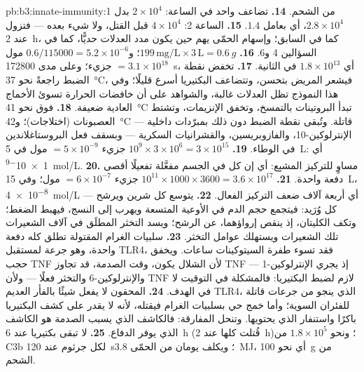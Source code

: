 \begin{solution}{pb:b3:innate-immunity:1}
من الشحم.
\textbf{14.} تضاعف واحد في الساعة: $2\times 10^{4}$ بدل
$2.8\times 10^{4}$، أي بعامل $1.4$.
\textbf{15.} الساعة 2: $4\times 10^{4}$ قبل القتل، ولا شيء بعده ---
فتزول عند \qty{2}{h}، كما في السابق؛ وإسهام الحمّى يهم حين
يكون مدد العدلات حديًّا، كما في السؤالين 4 و6.
\textbf{16.} $199\,\text{mg/L}\times 3\,\text{L} = \qty{0.6}{g}$؛ و$0.6/
\num{115000} = 5.2\times 10^{-6}$ مول $= 3.1\times 10^{18}$ جزيء؛
وعلى مدى \qty{172800}{s}، أي $1.8\times 10^{13}$ في الثانية.
\textbf{17.} تخفض نقطة الضبط راجعةً نحو \qty{37}{\celsius}، فيشعر
المريض بتحسن، وتتضاعف البكتيريا أسرع قليلًا؛ وفي هذا
النموذج تظل العدلات غالبة، والشواهد على أن خافضات الحرارة
تسوئ الأخماج العادية ضعيفة.
\textbf{18.} فوق نحو \qty{41}{\celsius} تبدأ البروتينات بالتمسخ،
وتخفق الإنزيمات، وتشتط العصبونات (اختلاجات)؛ و\qty{42}{\celsius}
قاتلة. وتُبقى نقطة الضبط دون ذلك بمبرّدات داخلية ---
الإنترلوكين-10، والفازوبريسين، والقشرانيات السكرية --- وبسقف
فعل البروستاغلاندين في الوطاء.
\textbf{19.} $10^{9}\times 3\times 10^{6} = 3\times 10^{15}$ جزيء
$= 5\times 10^{-9}$ مول في \qty{5}{L}: أي \qty{1e-9}{mol/L}.
\textbf{20.} مساوٍ للتركيز المشبِع: أي إن كل  في الجسم
مفعَّلة تفعيلًا أقصى دفعة واحدة.
\textbf{21.} $10^{11}\times 1000\times 3600 = 3.6\times 10^{17}$ جزيء
$= 6\times 10^{-7}$ مول؛ وفي \qty{15}{L}، \qty{4e-8}{mol/L} --- أي أربعة
آلاف ضعف التركيز الفعال.
\textbf{22.} يتوسع كل شرين ويرشح كل وُرَيد: فيتجمع حجم الدم في
الأوعية المتسعة ويهرب إلى النسج، فيهبط الضغط؛ وتكف
الكليتان، إذ ينقص إرواؤهما، عن الرشح؛ ويسد التخثر المطلَق
في آلاف الشعيرات تلك الشعيرات ويستهلك عوامل التخثر.
\textbf{23.} سلبيات الغرام المقتولة تطلق 
كله دفعة واحدة، وهو جرعة لمستقبل TLR4، فقد تسوء طفرة
السيتوكينات ساعات. ويخفق حجب TNF لأن الشلال يكون، وقت
الصدمة، قد تجاوز TNF --- إذ يجري الإنترلوكين-1
والإنترلوكين-6 والتخثر فعلًا --- ولأن TNF لازم لضبط
البكتيريا: فالمشكلة في التوقيت لا في الهدف.
\textbf{24.}  المحقون لا يفعل شيئًا بالفأر
العديم TLR4، الذي ينجو من جرعات قاتلة للفئران السوية؛ وأما
خمج حي بسلبيات الغرام فيقتله، لأنه لا يقدر على كشف
البكتيريا باكرًا واستنفار  الذي يحتويها. وتنحل
المفارقة: فالكاشف الذي يسبب الصدمة هو الكاشف الذي يوفر
الدفاع.
\textbf{25.} لا تبقى بكتيريا عند \qty{6}{h} (قُتلت كلها عند
\qty{2}{h})؛ ونحو $1.8\times 10^{5}$ من C3b لكل جرثوم عند
\qty{120}{s}؛ ويكلف يومان من الحمّى \qty{3.8}{MJ}، أي نحو
\qty{100}{g} من الشحم.
\end{solution}

